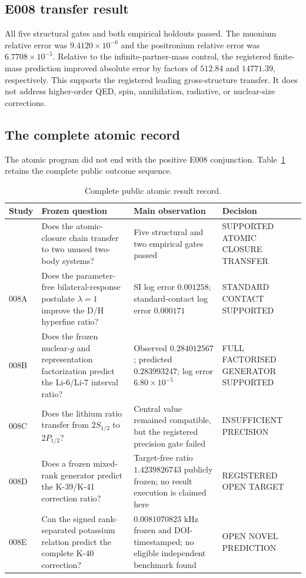 \documentclass[11pt,a4paper]{article}
\begin{document}
\subsection{E008 transfer result}

All five structural gates and both empirical holdouts passed. The muonium relative error was $9.4120\times10^{-6}$ and the positronium relative error was $6.7708\times10^{-5}$. Relative to the infinite-partner-mass control, the registered finite-mass prediction improved absolute error by factors of $512.84$ and $14771.39$, respectively. This supports the registered leading gross-structure transfer. It does not address higher-order QED, spin, annihilation, radiative, or nuclear-size corrections.

\subsection{The complete atomic record}

The atomic program did not end with the positive E008 conjunction. Table~\ref{tab:atomic-record} retains the complete public outcome sequence.

\begin{table}[H]
\centering
\footnotesize
\caption{Complete public atomic result record.}
\label{tab:atomic-record}
\begin{tabularx}{\textwidth}{@{}>{\raggedright\arraybackslash}p{1.25cm}>{\raggedright\arraybackslash}p{4.0cm}>{\raggedright\arraybackslash}X>{\raggedright\arraybackslash}p{3.15cm}@{}}
\toprule
Study & Frozen question & Main observation & Decision \\
\midrule
008 & Does the atomic-closure chain transfer to two unused two-body systems? & Five structural and two empirical gates passed & \textsf{SUPPORTED ATOMIC CLOSURE TRANSFER} \\
008A & Does the parameter-free bilateral-response postulate $\lambda=1$ improve the D/H hyperfine ratio? & SI log error $0.001258$; standard-contact log error $0.000171$ & \textsf{STANDARD CONTACT SUPPORTED} \\
008B & Does the frozen nuclear-$g$ and representation factorization predict the Li-6/Li-7 interval ratio? & Observed $0.284012567$; predicted $0.283993247$; log error $6.80\times10^{-5}$ & \textsf{FULL FACTORISED GENERATOR SUPPORTED} \\
008C & Does the lithium ratio transfer from $2S_{1/2}$ to $2P_{1/2}$? & Central value remained compatible, but the registered precision gate failed & \textsf{INSUFFICIENT PRECISION} \\
008D & Does a frozen mixed-rank generator predict the K-39/K-41 correction ratio? & Target-free ratio $1.4239826743$ publicly frozen; no result execution is claimed here & \textsf{REGISTERED OPEN TARGET} \\
008E & Can the signed rank-separated potassium relation predict the complete K-40 correction? & $0.0081070823$ kHz frozen and DOI-timestamped; no eligible independent benchmark found & \textsf{OPEN NOVEL PREDICTION} \\
\bottomrule
\end{tabularx}
\end{table}
\end{document}
